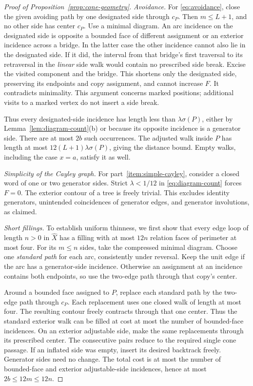 \begin{proof}[Proof of Proposition~\ref{prop:cone-geometry}]
\emph{Avoidance.}
For \eqref{eq:avoidance}, close the given avoiding path by one designated
side through \(c_P\). Then \(m\le L+1\), and no other side has center
\(c_P\). Use a minimal diagram. An arc incidence on the designated side
is opposite a bounded face of different assignment or an exterior
incidence across a bridge. In the latter case the other incidence cannot
also lie in the designated side. If it did, the interval from that
bridge's first traversal to its retraversal in the \emph{linear} side
walk would contain no prescribed side break. Excise the visited component
and the bridge. This shortens only the designated side, preserving its
endpoints and copy assignment, and cannot increase \(F\). It contradicts
minimality. This argument concerns marked positions; additional visits to
a marked vertex do not insert a side break.

Thus every designated-side incidence has length less than
\(\lambda\sigma(P)\), either by Lemma~\ref{lem:diagram-count}(b) or
because its opposite incidence is a generator side. There are at most
\(2b\) such occurrences. The adjusted walk inside \(P\) has length at
most \(12(L+1)\lambda\sigma(P)\), giving the distance bound. Empty
walks, including the case \(x=a\), satisfy it as well.

\emph{Simplicity of the Cayley graph.}
For part~\ref{item:simple-cayley}, consider a closed word of one or two
generator sides. Strict \(\lambda<1/12\) in
\eqref{eq:diagram-count} forces \(F=0\). The exterior contour of a tree
is freely trivial. This excludes identity generators, unintended
coincidences of generator edges, and generator involutions, as claimed.

\emph{Short fillings.}
To establish uniform thinness, we first show that
every edge loop of length \(n>0\) in \(\widehat X\) has a filling with
at most \(12n\) relation faces of perimeter at most four. For its
\(m\le n\) sides, take the compressed minimal diagram. Choose one
\emph{standard path} for each arc, consistently under reversal. Keep the
unit edge if the arc has a generator-side incidence. Otherwise an
assignment at an incidence contains both endpoints, so use the two-edge
path through that copy's center.

Around a bounded face assigned to \(P\), replace each standard path by
the two-edge path through \(c_P\). Each replacement uses one closed walk
of length at most four. The resulting contour freely contracts through
that one center. Thus the standard exterior walk can be filled at cost
at most the number of bounded-face incidences. On an exterior adjustable
side, make the same replacements through its prescribed center. The
consecutive pairs reduce to the required single cone passage. If an
inflated side was empty, insert its desired backtrack freely. Generator
sides need no change. The total cost is at most the number of bounded-face
and exterior adjustable-side incidences, hence at most
\(2b\le12m\le12n\).


\end{proof}

